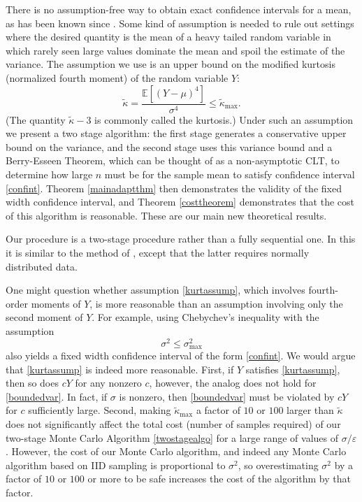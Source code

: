 \documentclass[graybox]{svmult}
\newcommand\e{\mathbb{E}}
\newcommand{\tkappa}{\tilde{\kappa}}
\begin{document}
There is no assumption-free way to obtain exact confidence intervals for a mean,
as has been known since \cite{BahSav56}. Some kind of assumption is needed to rule out settings where the desired quantity is the
mean of a heavy tailed random variable in which
rarely seen large values dominate the mean and spoil the estimate of the variance.
The assumption we use is an upper bound on
the modified kurtosis (normalized fourth moment) of the
random variable $Y$:
\begin{equation} \label{kurtassump}
\tkappa = \frac{\e[(Y-\mu)^4]}{\sigma^4} \le \tkappa_{\max}.
\end{equation}
(The quantity $\tkappa-3$ is commonly called the kurtosis.)  Under such an assumption we present
a two stage algorithm: the first stage generates
a conservative upper bound on the variance, and the second stage
uses this variance bound and a Berry-Esseen Theorem, which can be thought of as a non-asymptotic CLT, to determine how large $n$ must be for the sample mean to satisfy confidence interval \eqref{confint}.  Theorem \ref{mainadaptthm} then demonstrates the validity of the fixed width confidence interval, and Theorem \ref{costtheorem} demonstrates that the cost of this algorithm is reasonable.  These are our main new theoretical results.

Our procedure is a two-stage procedure
rather than a fully sequential one.  In
this it is similar to the method of
\cite{Stei1945a,Stei1949a}, except that
the latter requires normally distributed
data.

One might question whether assumption \eqref{kurtassump}, which involves fourth-order moments of $Y$, is more reasonable than an assumption involving only the second moment of $Y$.  For example, using Chebychev's inequality with the assumption 
\begin{equation} \label{boundedvar}
\sigma^2 \le \sigma^2_{\max}
\end{equation}
also yields a fixed width confidence interval of the form \eqref{confint}.  We would argue that \eqref{kurtassump} is indeed more reasonable.  First, if $Y$ satisfies \eqref{kurtassump}, then so does $cY$ for any nonzero $c$, however, the analog does not hold for \eqref{boundedvar}.  In fact, if $\sigma$ is nonzero, then \eqref{boundedvar} must be violated by $cY$ for $c$ sufficiently large.  Second, making $\tkappa_{\max}$ a factor of $10$ or $100$ larger than $\tkappa$ does not significantly affect the total cost (number of samples required) of our two-stage Monte Carlo Algorithm \ref{twostagealgo} for a large range of values of $\sigma/\varepsilon$.  However, the cost of our Monte Carlo algorithm, and indeed any Monte Carlo algorithm based on IID sampling is proportional to $\sigma^2$, so overestimating $\sigma^2$ by a factor of $10$ or $100$ or more to be safe increases the cost of the algorithm by that factor. 
\end{document}

